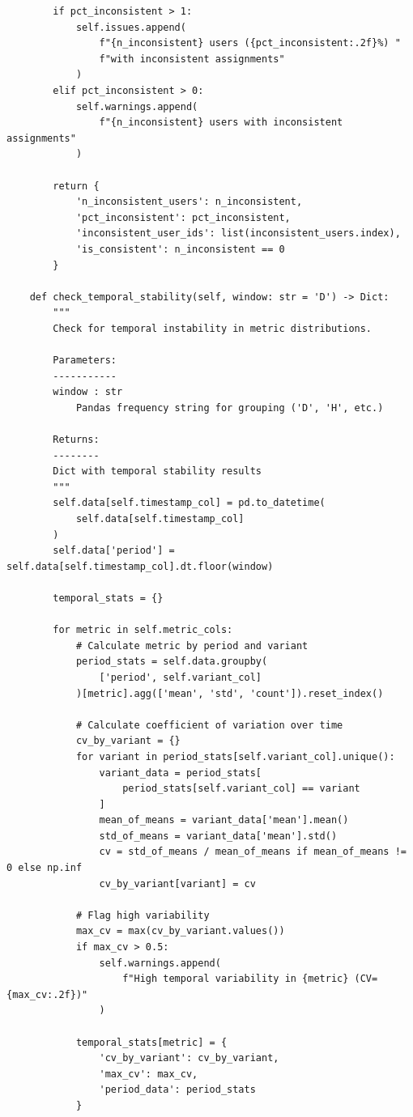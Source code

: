 \begin{lstlisting}
        if pct_inconsistent > 1:
            self.issues.append(
                f"{n_inconsistent} users ({pct_inconsistent:.2f}%) "
                f"with inconsistent assignments"
            )
        elif pct_inconsistent > 0:
            self.warnings.append(
                f"{n_inconsistent} users with inconsistent assignments"
            )

        return {
            'n_inconsistent_users': n_inconsistent,
            'pct_inconsistent': pct_inconsistent,
            'inconsistent_user_ids': list(inconsistent_users.index),
            'is_consistent': n_inconsistent == 0
        }

    def check_temporal_stability(self, window: str = 'D') -> Dict:
        """
        Check for temporal instability in metric distributions.

        Parameters:
        -----------
        window : str
            Pandas frequency string for grouping ('D', 'H', etc.)

        Returns:
        --------
        Dict with temporal stability results
        """
        self.data[self.timestamp_col] = pd.to_datetime(
            self.data[self.timestamp_col]
        )
        self.data['period'] = self.data[self.timestamp_col].dt.floor(window)

        temporal_stats = {}

        for metric in self.metric_cols:
            # Calculate metric by period and variant
            period_stats = self.data.groupby(
                ['period', self.variant_col]
            )[metric].agg(['mean', 'std', 'count']).reset_index()

            # Calculate coefficient of variation over time
            cv_by_variant = {}
            for variant in period_stats[self.variant_col].unique():
                variant_data = period_stats[
                    period_stats[self.variant_col] == variant
                ]
                mean_of_means = variant_data['mean'].mean()
                std_of_means = variant_data['mean'].std()
                cv = std_of_means / mean_of_means if mean_of_means != 0 else np.inf
                cv_by_variant[variant] = cv

            # Flag high variability
            max_cv = max(cv_by_variant.values())
            if max_cv > 0.5:
                self.warnings.append(
                    f"High temporal variability in {metric} (CV={max_cv:.2f})"
                )

            temporal_stats[metric] = {
                'cv_by_variant': cv_by_variant,
                'max_cv': max_cv,
                'period_data': period_stats
            }


\end{lstlisting}
